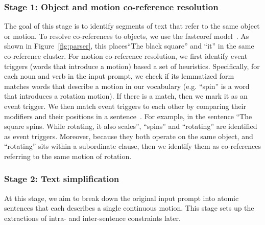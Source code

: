 \subsubsection{Stage 1: Object and motion co-reference resolution}
The goal of this stage is to identify segments of text that refer to
the same object or motion.
%
To resolve co-references to objects, we use the fastcoref
model~\cite{otmazgin2022fastcoref}.  As shown in
Figure~\ref{fig:parser}, this places``The black square'' and
``it'' in the same co-reference cluster.
%
For motion co-reference resolution, we first identify event triggers
(words that introduce a motion) based a set of heuristics.
Specifically, for each noun and verb in the input prompt, we check if
its lemmatized form matches words that describe a motion in our
vocabulary (e.g. ``spin'' is a word that introduces a rotation
motion).   If there is a match, then
we mark it as an event trigger.  We then match event triggers to each
other by comparing their modifiers and their positions in a
sentence~\cite{ahmed2023lemmamatching, kenyondean2018lemmaheuristic}.
For example, in the sentence ``The square spins. While rotating, it
also scales'', ``spins'' and ``rotating'' are identified as event
triggers.  Moreover, because they both operate on the same object, and
``rotating'' sits within a subordinate clause, then we identify them
as co-references referring to the same motion of rotation.

\subsubsection{Stage 2: Text simplification}
At this stage, we aim to break down the original input prompt into
atomic sentences that each describes a single continuous motion.
This stage sets up the extractions of intra- and inter-sentence
constraints later. 

